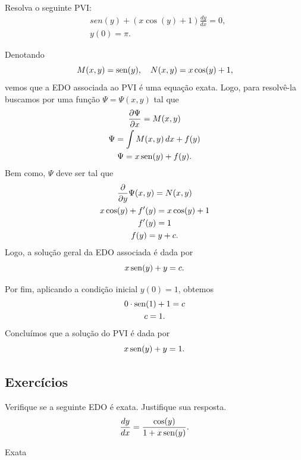 \begin{exeresol}
  Resolva o seguinte PVI:
  \begin{align}
    &sen(y) + (x\cos(y)+1)\frac{dy}{dx} = 0,\\
    &y(0)=\pi.
  \end{align}
\end{exeresol}
\begin{resol}
  Denotando
  \begin{equation}
    M(x,y) = \operatorname{sen}(y),\quad N(x,y) = x\cos(y)+1,
  \end{equation}
  vemos que a EDO associada ao PVI é uma equação exata. Logo, para resolvê-la buscamos por uma função $\Psi = \Psi(x,y)$ tal que
  \begin{gather}
    \frac{\partial \Psi}{\partial x} = M(x,y) \\
    \Psi = \int M(x,y)\,dx + f(y) \\
    \Psi = x\operatorname{sen}(y) + f(y).
  \end{gather}
  Bem como, $\Psi$ deve ser tal que
  \begin{gather}
    \frac{\partial}{\partial y}\Psi(x,y) = N(x,y) \\
    x\cos(y) + f'(y) = x\cos(y)+1 \\
    f'(y) = 1 \\
    f(y) = y + c.
  \end{gather}
  Logo, a solução geral da EDO associada é dada por
  \begin{equation}
    x\operatorname{sen}(y) + y = c.
  \end{equation}

  Por fim, aplicando a condição inicial $y(0) = 1$, obtemos
  \begin{gather}
    0\cdot\operatorname{sen}(1)+1 = c \\
    c = 1.
  \end{gather}
  Concluímos que a solução do PVI é dada por
  \begin{equation}
    x\operatorname{sen}(y) + y = 1.
  \end{equation}
\end{resol}

\subsection*{Exercícios}

\begin{exer}
  Verifique se a seguinte EDO é exata. Justifique sua resposta.
  \begin{equation}
    \frac{dy}{dx} = \frac{\cos(y)}{1+x\operatorname{sen}(y)}.
  \end{equation}
\end{exer}
\begin{resp}
  Exata
\end{resp}

